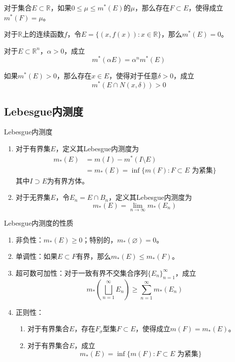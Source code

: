 \documentclass[lang = cn, scheme = chinese, thmcnt = section]{elegantbook}
\newcommand{\R}{\mathbb{R}}            %
\newcommand{\sub}{\subset}             %
\begin{document}
\begin{exercise}
	对于集合$E\sub\R$，如果$0\le\mu\le m^*(E)$的$\mu$，那么存在$F\sub E$，使得成立$m^*(F)=\mu$。
\end{exercise}

\begin{exercise}
	对于$\R$上的连续函数$f$，令$E=\{(x,f(x)):x\in\R\}$，那么$m^*(E)=0$。
\end{exercise}

\begin{exercise}
	对于$E\sub\R^n$，$\alpha>0$，成立%
	$$
	m^*(\alpha E)=\alpha^n m^*(E)
	$$
\end{exercise}

\begin{exercise}
	如果$m^*(E)>0$，那么存在$x\in E$，使得对于任意$\delta>0$，成立
	$$
	m^*(E\cap N(x,\delta))>0
	$$
\end{exercise}

\subsection{Lebesgue内测度}

\begin{definition}{Lebesgue内测度}
	\begin{enumerate}
		\item 对于有界集$E$，定义其Lebesgue内测度为%
		\begin{align*}
			m_*(E)&=m(I)-m^*(I\setminus E)\\
			&=m_*(E)=\inf\{ m(F):F\sub E\text{ 为紧集} \}
		\end{align*}
		其中$I\supset E$为有界方体。
		\item 对于无界集$E$，令$E_n=E\cap B_n$，定义其Lebesgue内测度为%
		$$
		m_*(E)=\lim_{n\to\infty}m_*(E_n)
		$$
	\end{enumerate}
\end{definition}

\begin{theorem}{Lebesgue内测度的性质}
	\begin{enumerate}
		\item 非负性：$m_*(E)\ge 0$；特别的，$m_*(\varnothing)=0$。
		\item 单调性：如果$E\sub F$有界，那么$m_*(E)\le m_*(F)$。
		\item 超可数可加性：对于一致有界不交集合序列$\{ E_n \}_{n=1}^{\infty}$，成立
		$$
		m_*\left(\bigsqcup_{n=1}^{\infty}{E_n}\right)\ge\sum_{n=1}^{\infty}{m_*(E_n)}
		$$
		\item 正则性：
		\begin{enumerate}
			\item 对于有界集合$E$，存在$F_\sigma$型集$F\sub E$，使得成立$m(F)=m_*(E)$。
			\item 对于有界集合$E$，成立
			$$
			m_*(E)=\inf\{ m(F):F\sub E\text{ 为紧集} \}
			$$
		\end{enumerate}
	\end{enumerate}
\end{theorem}
\end{document}
